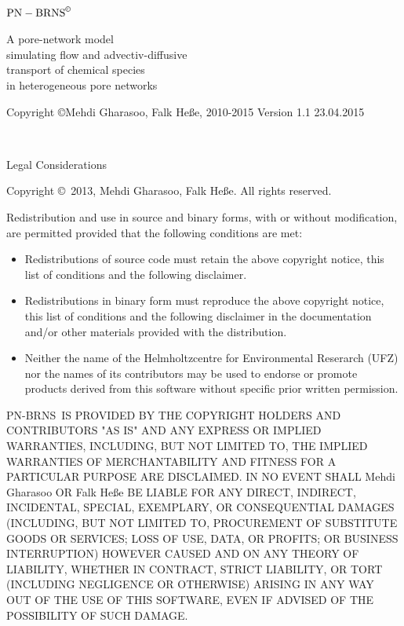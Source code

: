 \documentclass[12pt]{report}
\def\QI{{\sc PN-BRNS}}
\begin{document}
\ \vskip4cm
{\centering\huge $\mathrm{PN-BRNS}^{\copyright}$\par}
\vskip1cm
{\Large\sc\centering A pore-network model\\
simulating flow and advectiv-diffusive\\
transport of chemical species \\
in heterogeneous pore networks\par}

\vskip15mm
\begin{center}
  \par
\end{center}

\vfill
{\sf Copyright \copyright Mehdi Gharasoo, Falk He{\ss}e, 2010-2015
\hfill Version 1.1 23.04.2015}

\break

\begingroup\leftskip=5mm\parindent=0mm\sf\ \vfill

{\large\sc Legal Considerations\par}
\smallskip

Copyright \copyright\ 2013, Mehdi Gharasoo, Falk He{\ss}e.
All rights reserved.

Redistribution and use in source and binary forms, with or without
modification, are permitted provided that the following conditions are met:

\begin{itemize}
	\item Redistributions of source code must retain the above copyright notice, this list of conditions and the following disclaimer.
	\item Redistributions in binary form must reproduce the above copyright notice, this list of conditions and the following disclaimer in the documentation and/or other materials provided with the distribution.
	\item Neither the name of the Helmholtzcentre for Environmental Reserarch (UFZ) nor the names of its contributors may be used to endorse or promote products derived from this software without specific prior written permission.
\end{itemize}

\QI\ IS PROVIDED BY THE COPYRIGHT HOLDERS AND CONTRIBUTORS "AS IS" AND ANY EXPRESS OR IMPLIED WARRANTIES, INCLUDING, BUT NOT LIMITED TO, THE IMPLIED WARRANTIES OF MERCHANTABILITY AND FITNESS FOR A PARTICULAR PURPOSE ARE DISCLAIMED. IN NO EVENT SHALL Mehdi Gharasoo OR Falk He{\ss}e BE LIABLE FOR ANY DIRECT, INDIRECT, INCIDENTAL, SPECIAL, EXEMPLARY, OR CONSEQUENTIAL DAMAGES (INCLUDING, BUT NOT LIMITED TO, PROCUREMENT OF SUBSTITUTE GOODS OR SERVICES; LOSS OF USE, DATA, OR PROFITS; OR BUSINESS INTERRUPTION) HOWEVER CAUSED AND ON ANY THEORY OF LIABILITY, WHETHER IN CONTRACT, STRICT LIABILITY, OR TORT (INCLUDING NEGLIGENCE OR OTHERWISE) ARISING IN ANY WAY OUT OF THE USE OF THIS SOFTWARE, EVEN IF ADVISED OF THE POSSIBILITY OF SUCH DAMAGE.
\end{document}
